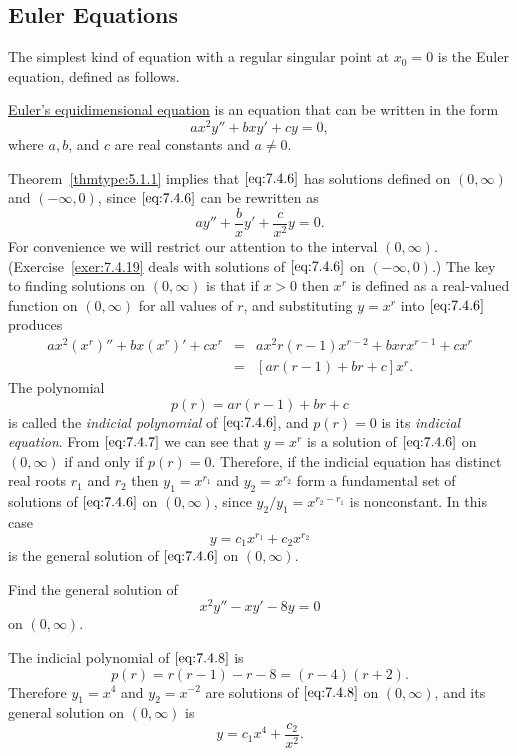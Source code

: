 \documentclass{ximera}
\begin{document}
\subsection*{Euler Equations}

The simplest kind of equation with a regular singular point at $x_0=0$
is the Euler equation, defined as follows.

\begin{definition}\label{thmtype:7.4.2}

\href{https://en.wikipedia.org/wiki/Cauchy%E2%80%93Euler_equation}{Euler's equidimensional equation} is an equation that can be written in the form
\begin{equation} \label{eq:7.4.6}
ax^2y''+bxy'+cy=0,
\end{equation}
where $a,b$, and $c$ are real constants and $a\neq0$.
\end{definition}

Theorem~\ref{thmtype:5.1.1} implies that $\eqref{eq:7.4.6}$ has solutions defined on $(0,\infty)$ and $(-\infty,0)$,
since $\eqref{eq:7.4.6}$ can be rewritten as
$$
ay''+\frac{b}{x}y'+\frac{c}{x^2}y=0.
$$
For convenience we will restrict our attention to the interval
$(0,\infty)$. 
(Exercise~\ref{exer:7.4.19} deals with solutions of $\eqref{eq:7.4.6}$ on $(-\infty,0)$.) 
The key to finding solutions on
$(0,\infty)$ is  that if $x>0$ then $x^r$ is defined as a
real-valued function on $(0,\infty)$ for all values of $r$, and
substituting $y=x^r$ into $\eqref{eq:7.4.6}$ produces
\begin{equation} \label{eq:7.4.7}
\begin{array}{lcl}
ax^2(x^r)''+bx(x^r)'+cx^r&=&ax^2r(r-1)x^{r-2}+bxrx^{r-1}+cx^r\\
&=&[ar(r-1)+br+c]x^r.
\end{array}
\end{equation}
The polynomial
$$
p(r)=ar(r-1)+br+c
$$
is called the \textit{indicial polynomial} of $\eqref{eq:7.4.6}$, and
$p(r)=0$
is its \textit{indicial equation}. From $\eqref{eq:7.4.7}$ we can
see that
$y=x^r$ is a solution of $\eqref{eq:7.4.6}$ on $(0,\infty)$ if and only if
$p(r)=0$. Therefore, if the indicial equation has distinct real roots
$r_1$ and $r_2$ then $y_1=x^{r_1}$ and $y_2=x^{r_2}$ form a
fundamental set of solutions of $\eqref{eq:7.4.6}$ on
$(0,\infty)$, since $y_2/y_1=x^{r_2-r_1}$ is nonconstant.
In this case
$$
y=c_1x^{r_1}+c_2x^{r_2}
$$
is the general solution of $\eqref{eq:7.4.6}$ on $(0,\infty)$.

\begin{example}\label{example:7.4.4}
 Find the general solution of
\begin{equation} \label{eq:7.4.8}
x^2y''-xy'-8y=0
\end{equation}
on  $(0,\infty)$.
\begin{explanation}
The indicial polynomial of $\eqref{eq:7.4.8}$ is
$$
p(r)=r(r-1)-r-8=(r-4)(r+2).
$$
Therefore $y_1=x^4$ and $y_2=x^{-2}$ are solutions of $\eqref{eq:7.4.8}$ on
$(0,\infty)$, and its general solution on $(0,\infty)$ is
$$
y=c_1x^4+\frac{c_2}{x^2}.
$$
\end{explanation}
\end{example}
\end{document}
